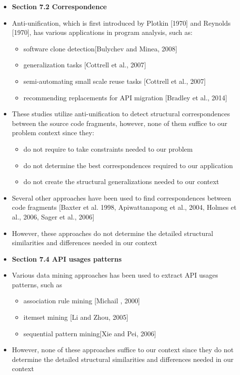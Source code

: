 \documentclass{article}
\newcommand{\bold}{\textbf}
\begin{document}
\begin{itemize} [leftmargin=.1in]
\item \bold{Section 7.2 Correspondence}
\item Anti-unification, which is first introduced by Plotkin [1970] and Reynolds [1970], has various applications in program analysis, such as: 
\begin{itemize}
\item software clone detection[Bulychev and Minea, 2008]
\item generalization tasks [Cottrell et al., 2007]
\item semi-automating small scale reuse tasks [Cottrell et al., 2007]
\item recommending replacements for API migration [Bradley et al., 2014]
\end{itemize}
\item These studies utilize anti-unification to detect structural correspondences between the source code fragments, however, none of them suffice to our problem context since they:
\begin{itemize}
\item do not require to take constraints needed to our problem
\item do not determine the best correspondences required to our application
\item do not create the structural generalizations needed to our context
\end{itemize}
\item Several other approaches have been used to find correspondences between code fragments [Baxter et al. 1998, Apiwattanapong et al., 2004, Holmes et al., 2006, Sager et al., 2006] 
\item However, these approaches do not determine the detailed structural similarities and differences needed in our context 


\item \bold{Section 7.4 API usages patterns}
\item Various data mining approaches has been used to extract API usages patterns, such as 
\begin{itemize}
\item association rule mining [Michail , 2000]
\item itemset mining [Li and Zhou, 2005]
\item sequential pattern mining[Xie and Pei, 2006]
\end{itemize}
\item However, none of these approaches suffice to our context since they do not determine the detailed structural similarities and differences needed in our context


\end{itemize}
\end{document}
